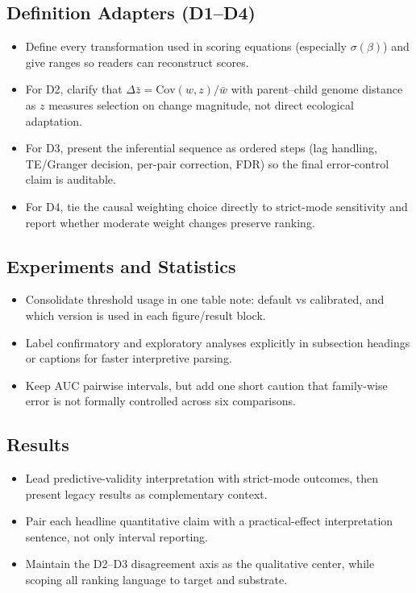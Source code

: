 \documentclass[11pt]{article}
\begin{document}
\subsection*{Definition Adapters (D1--D4)}
\begin{itemize}
  \item Define every transformation used in scoring equations (especially $\sigma(\beta)$) and give ranges so readers can reconstruct scores.
  \item For D2, clarify that $\Delta\bar{z}=\mathrm{Cov}(w,z)/\bar{w}$ with parent--child genome distance as $z$ measures selection on change magnitude, not direct ecological adaptation.
  \item For D3, present the inferential sequence as ordered steps (lag handling, TE/Granger decision, per-pair correction, FDR) so the final error-control claim is auditable.
  \item For D4, tie the causal weighting choice directly to strict-mode sensitivity and report whether moderate weight changes preserve ranking.
\end{itemize}

\subsection*{Experiments and Statistics}
\begin{itemize}
  \item Consolidate threshold usage in one table note: default vs calibrated, and which version is used in each figure/result block.
  \item Label confirmatory and exploratory analyses explicitly in subsection headings or captions for faster interpretive parsing.
  \item Keep AUC pairwise intervals, but add one short caution that family-wise error is not formally controlled across six comparisons.
\end{itemize}

\subsection*{Results}
\begin{itemize}
  \item Lead predictive-validity interpretation with strict-mode outcomes, then present legacy results as complementary context.
  \item Pair each headline quantitative claim with a practical-effect interpretation sentence, not only interval reporting.
  \item Maintain the D2--D3 disagreement axis as the qualitative center, while scoping all ranking language to target and substrate.
\end{itemize}
\end{document}
